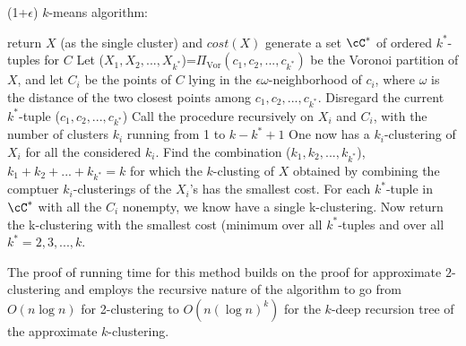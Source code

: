 \begin{algorithm}[H]
  \caption{(1+$\epsilon$) $k$-means algorithm:}
\begin{algorithmic} 
  \STATE return $X$ (as the single cluster) and $cost(X)$
\ENDIF
{}
  \STATE generate a set $\cC^*$ of ordered $k^*$-tuples for $C$
    \STATE Let ($X_1,X_2,...,X_{k^*}$)=$\Pi_{\text{Vor}}(c_1,c_2,...,c_{k^*})$ be
    the Voronoi partition of $X$, and let $C_i$ be the points of $C$ lying in the
    $\epsilon \omega$-neighborhood of $c_i$, where $\omega$ is the distance of
    the two closest points among $c_1,c_2,...,c_{k^*}$.
      \STATE Disregard the current $k^*$-tuple
      ($c_1,c_2,...,c_{k^*}$)
    \ELSE
        \STATE Call the procedure recursively on $X_i$ and $C_i$, with
        the number of clusters $k_i$ running from 1 to $k-k^*+1$
      \ENDFOR
      \STATE One now has a $k_i$-clustering of $X_i$ for all the
      considered $k_i$.
      \STATE Find the combination
      ($k_1,k_2,...,k_{k^*}$),$k_1+k_2+...+k_{k^*}=k$ for which the
      $k$-clusting of $X$ obtained by combining the comptuer
      $k_i$-clusterings of the $X_i$'s has the smallest cost.
    \ENDIF
  \ENDFOR
\ENDFOR
\STATE For each $k^*$-tuple in $\cC^*$ with all the $C_i$ nonempty,
we know have a single k-clustering. Now return the k-clustering with
the smallest cost (minimum over all $k^*$-tuples and over all $k^*=2,3,...,k$.
\end{algorithmic}
\end{algorithm}

\begin{remark}
The proof of running time for this method builds on the proof for approximate $2$-clustering and employs the recursive nature of the algorithm to go from $O(n \log n)$ for 2-clustering to $O(n (\log n)^k)$ for the $k$-deep recursion tree of the approximate $k$-clustering.
\end{remark}

